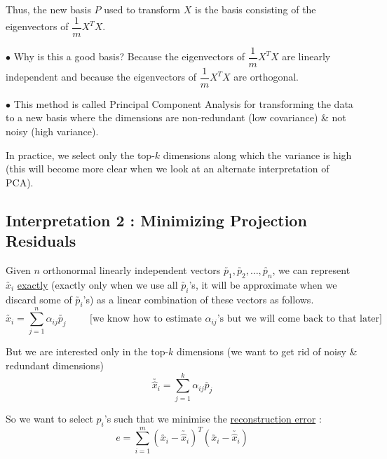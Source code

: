 \documentclass[11pt, a4paper]{article}
\begin{document}
Thus, the new basis $P$ used to transform $X$ is the basis consisting of the eigenvectors of $\dfrac{1}{m} X^T X$. \\

\vspace{0.3cm}

$\bullet$ Why is this a good basis? Because the eigenvectors of $\dfrac{1}{m}X^T X$ are linearly independent and because the eigenvectors of $\dfrac{1}{m}X^T X$ are orthogonal. \\

\vspace{0.3cm}

$\bullet$ This method is called Principal Component Analysis for transforming the data to a new basis where the dimensions are non-redundant (low covariance) \& not noisy (high variance). \\

\vspace{0.3cm}

In practice, we select only the top-$k$ dimensions along which the variance is high (this will become more clear when we look at an alternate interpretation of PCA).

\newpage

\subsection{Interpretation 2 : Minimizing Projection Residuals}

Given $n$ orthonormal linearly independent vectors $\utilde{p_1}, \utilde{p_2}, \ldots, \utilde{p_n}$, we can represent $\utilde{x_i}$ \underline{exactly} (exactly only when we use all $\utilde{p_i}$'s, it will be approximate when we discard some of $\utilde{p_i}$'s) as a linear combination of these vectors as follows.
\[
\utilde{x_i} = \sum_{j=1}^{n} \alpha_{ij} \utilde{p_j} \hspace{1cm}  \text{[we know how to estimate $\alpha_{ij}$'s but we will come back to that later]}
\]

But we are interested only in the top-$k$ dimensions (we want to get rid of noisy \& redundant dimensions)
\[
\utilde{\hat{x}_i} = \sum_{j=1}^{k} \alpha_{ij} \utilde{p_j}
\]

So we want to select $p_i$'s such that we minimise the \underline{reconstruction error} :
\[
e = \sum_{i=1}^{m} (\utilde{x_i} - \utilde{\hat{x}_i})^T (\utilde{x_i} - \utilde{\hat{x}_i})
\]
\end{document}
